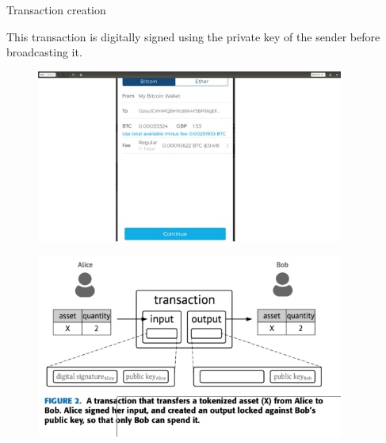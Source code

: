 \documentclass[serif]{beamer}
\begin{document}
\begin{frame}{Transaction creation}

		This transaction is digitally signed using the private key of the sender
		before broadcasting it.
			\begin{figure}
				\includegraphics[width=0.9\textwidth]{result}
				\label{fig:result}
			\end{figure}

\end{frame}


\begin{frame}
	\begin{figure}
		\includegraphics[width=0.9\textwidth]{trans}
		\label{fig:result10}
	\end{figure}
\end{frame}
	
\end{document}
